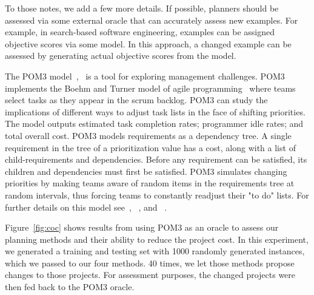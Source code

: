 \documentclass{sig-alternate}
\newcommand{\fig}[1]{Figure~\ref{fig:#1}}
\begin{document}
To those notes, we add a few more details. If possible, planners should be assessed via some external oracle that can accurately assess new examples. For example, in search-based software engineering,
examples can be assigned objective scores via  some model. In this approach, a changed example can be assessed by
generating actual objective scores from the model. 




The POM3 model~\cite{boehm2003using},~\cite{port2008} is a tool for exploring management challenges. POM3 implements the Boehm and Turner model of agile programming~\cite{boehm2003balancing} where teams select tasks as they appear in the scrum backlog.  POM3 can study the implications of different ways to adjust task lists in the face of shifting priorities. The model outputs estimated task completion rates; programmer idle rates; and total overall cost. POM3 models requirements as a dependency tree. A single requirement in the tree of a prioritization value has a cost, along with a list of child-requirements and dependencies. Before any requirement can be satisfied, its children and dependencies must first be satisfied. POM3 simulates changing priorities by making teams aware of random items in the requirements tree at random intervals, thus forcing teams to constantly readjust their "to do" lists. For further details on this model see~\cite{boehm2003balancing}, ~\cite{boehm2003using}, and ~\cite{port2008}. 

\fig{coc} shows results from using POM3 as an oracle to assess our planning methods and their ability to reduce the project cost. In this experiment, we generated a training and testing set with 1000 randomly generated instances, which we passed to our four methods.
40 times, we let those methods propose changes to those projects. 
For assessment purposes, the changed projects were then fed back to the POM3
oracle. 
\end{document}
